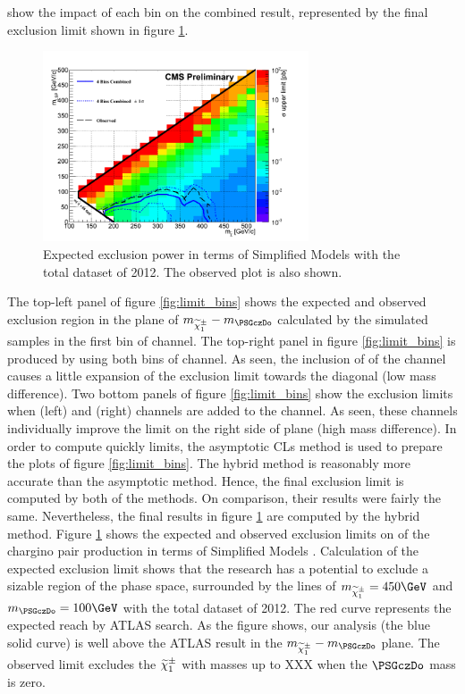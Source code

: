  show the impact of each bin on the combined result, represented by the final exclusion limit shown in figure \ref{fig:limit_final}. 
\begin{linenomath}
\begin{figure}[h]
\centering
\includegraphics[width=0.7\textwidth,keepaspectratio=true]{StatisticsFig/Exclusion4Bins.png}
\caption{Expected exclusion power in terms of Simplified Models
with the total dataset of 2012. The observed plot is also shown.
}
\label{fig:limit_final}
\end{figure}
\end{linenomath}
The top-left panel of figure \ref{fig:limit_bins} shows the expected and observed exclusion region in the plane of $m_{\chione}-m_{\PSGczDo}$
calculated by the simulated samples in the first bin of \tauTau channel. The top-right panel in figure \ref{fig:limit_bins} 
is produced by using both bins of \tauTau channel.
As seen, the inclusion of \bintwo of the \tauTau channel causes a little expansion of the exclusion limit towards 
the diagonal (low mass difference).
Two bottom panels of figure \ref{fig:limit_bins} show the exclusion limits when \eTau (left) and \muTau (right) channels are 
added to the \tauTau channel.  As seen, these channels individually improve the limit on the right side of plane (high mass difference).
In order to compute quickly limits, the asymptotic CLs method is used to prepare the plots of figure \ref{fig:limit_bins}.
The hybrid method is reasonably more accurate than the asymptotic method. Hence, the final exclusion limit is computed by both of the methods.
On comparison, their results were fairly the same. 
Nevertheless, the final results in figure \ref{fig:limit_final} are computed by the hybrid method.
Figure \ref{fig:limit_final} shows the expected and observed exclusion limits 
on of the chargino pair production in terms of Simplified Models \cite{alves:sms}. 
Calculation of the expected exclusion limit shows that the research has a potential to exclude 
a sizable region of the phase space, surrounded by the lines of $m_{\chione} = 450\GeV$ and $m_{\PSGczDo} = 100\GeV$ with 
the total dataset of 2012.
The red curve represents the expected reach by ATLAS 
search. As the figure shows, our analysis (the blue solid curve) is well above the ATLAS result in the $m_{\chione}-m_{\PSGczDo}$ plane.
The observed limit excludes the $\widetilde{\chi}^{\pm}_1$ with masses up to XXX \GeV when the $\PSGczDo$ mass is zero.
